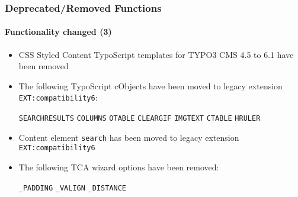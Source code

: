 \begin{frame}[fragile]
	\frametitle{Deprecated/Removed Functions}
	\framesubtitle{Functionality changed (3)}

	\begin{itemize}
		\item CSS Styled Content TypoScript templates for TYPO3 CMS 4.5 to 6.1 have been removed

		\item The following TypoScript cObjects have been moved to legacy extension
			\texttt{EXT:compatibility6}:

			\vspace{0.2cm}

			\small
				\texttt{SEARCHRESULTS} \tabto{3cm}\texttt{COLUMNS} \tabto{6cm}\texttt{OTABLE} \tabto{9cm}\texttt{CLEARGIF}\newline
				\texttt{IMGTEXT}       \tabto{3cm}\texttt{CTABLE}  \tabto{6cm}\texttt{HRULER}
			\normalsize

		\item Content element \texttt{search} has been moved to legacy extension \texttt{EXT:compatibility6}

		\item The following TCA wizard options have been removed:

			\vspace{0.2cm}

			\small
				\texttt{\_PADDING} \tabto{3cm}\texttt{\_VALIGN} \tabto{6cm}\texttt{\_DISTANCE}
			\normalsize

	\end{itemize}

\end{frame}


